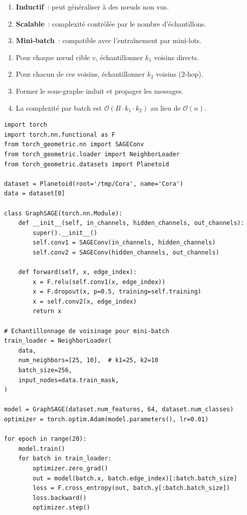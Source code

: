 \begin{proposition}
\begin{enumerate}
    \item \textbf{Inductif}~: peut g\'en\'eraliser \`a des n\oe uds non vus.
    \item \textbf{Scalable}~: complexit\'e contr\^ol\'ee par le nombre d'\'echantillons.
    \item \textbf{Mini-batch}~: compatible avec l'entra\^inement par mini-lots.
\end{enumerate}
\end{proposition}

\begin{algorithme}[title=\textbf{\'Echantillonnage de sous-graphes pour GraphSAGE}]
\begin{enumerate}
    \item Pour chaque n\oe ud cible $v$, \'echantillonner $k_1$ voisins directs.
    \item Pour chacun de ces voisins, \'echantillonner $k_2$ voisins (2-hop).
    \item Former le sous-graphe induit et propager les messages.
    \item La complexit\'e par batch est $\mathcal{O}(B \cdot k_1 \cdot k_2)$
          au lieu de $\mathcal{O}(n)$.
\end{enumerate}
\end{algorithme}

\begin{codeblock}[title=\textbf{GraphSAGE avec \'echantillonnage}]
\begin{verbatim}
import torch
import torch.nn.functional as F
from torch_geometric.nn import SAGEConv
from torch_geometric.loader import NeighborLoader
from torch_geometric.datasets import Planetoid

dataset = Planetoid(root='/tmp/Cora', name='Cora')
data = dataset[0]

class GraphSAGE(torch.nn.Module):
    def __init__(self, in_channels, hidden_channels, out_channels):
        super().__init__()
        self.conv1 = SAGEConv(in_channels, hidden_channels)
        self.conv2 = SAGEConv(hidden_channels, out_channels)

    def forward(self, x, edge_index):
        x = F.relu(self.conv1(x, edge_index))
        x = F.dropout(x, p=0.5, training=self.training)
        x = self.conv2(x, edge_index)
        return x

# Echantillonnage de voisinage pour mini-batch
train_loader = NeighborLoader(
    data,
    num_neighbors=[25, 10],  # k1=25, k2=10
    batch_size=256,
    input_nodes=data.train_mask,
)

model = GraphSAGE(dataset.num_features, 64, dataset.num_classes)
optimizer = torch.optim.Adam(model.parameters(), lr=0.01)

for epoch in range(20):
    model.train()
    for batch in train_loader:
        optimizer.zero_grad()
        out = model(batch.x, batch.edge_index)[:batch.batch_size]
        loss = F.cross_entropy(out, batch.y[:batch.batch_size])
        loss.backward()
        optimizer.step()
\end{verbatim}
\end{codeblock}

